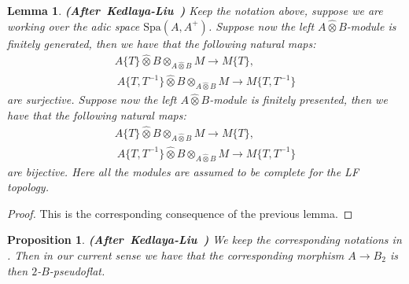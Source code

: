 \documentclass[12pt]{amsart}
\newtheorem{lemma}[theorem]{Lemma}
\newtheorem{proposition}[theorem]{Proposition}
\theoremstyle{definition}
\numberwithin{equation}{section}
\begin{document}
\begin{lemma} \mbox{\bf{(After Kedlaya-Liu \cite[Corollary 2.4.9]{KL2})}}
Keep the notation above, suppose we are working over the adic space $
\mathrm{Spa}(A,A^+)$. Suppose now the left $A\widehat{\otimes}B$-module is finitely generated, then we have that the following natural maps:
\begin{align}
A\{T\}\widehat{\otimes}B\otimes_{A\widehat{\otimes}B}M 	\rightarrow M\{T\},\\\
A\{T,T^{-1}\}\widehat{\otimes}B \otimes_{A\widehat{\otimes}B} M 	\rightarrow M\{T,T^{-1}\}	
\end{align}
are surjective. Suppose now the left $A\widehat{\otimes}B$-module is finitely presented, then we have that the following natural maps:
\begin{align}
A\{T\}\widehat{\otimes}B\otimes_{A\widehat{\otimes}B}M 	\rightarrow M\{T\},\\\
A\{T,T^{-1}\}\widehat{\otimes}B \otimes_{A\widehat{\otimes}B} M 	\rightarrow M\{T,T^{-1}\}	
\end{align}
are bijective. Here all the modules are assumed to be complete for the LF topology.


\end{lemma}


\begin{proof}
This is the corresponding consequence of the previous lemma.
\end{proof}






\begin{proposition} \mbox{\bf{(After Kedlaya-Liu \cite[Lemma 2.4.12]{KL2})}}
We keep the corresponding notations in \cite[Lemma 2.4.10]{KL2}. Then in our current sense we have that the corresponding morphism $A\rightarrow B_2$ is then $2$-$B$-pseudoflat. 
\end{proposition}
\end{document}
